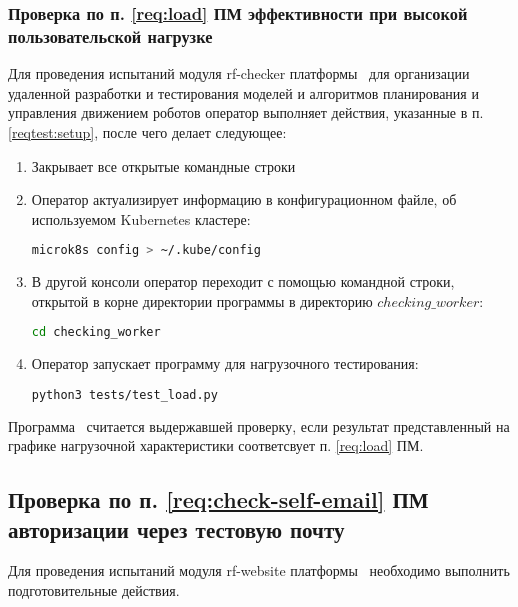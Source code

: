 \subsubsection{Проверка по п. \ref{req:load} ПМ эффективности при высокой пользовательской нагрузке} \label{reqtest:load}
Для проведения испытаний модуля rf-checker платформы \productname\ для организации удаленной разработки и тестирования моделей и алгоритмов планирования и управления движением роботов оператор выполняет действия, указанные в п. \ref{reqtest:setup}, после чего делает следующее:
\begin{enumerate}
    \item Закрывает все открытые командные строки
    \item Оператор актуализирует информацию в конфигурационном файле, об используемом Kubernetes кластере:
    \begin{lstlisting}[language=bash, numbers=none, frame=single]
        microk8s config > ~/.kube/config
    \end{lstlisting}
    \item В другой консоли оператор переходит с помощью командной строки, открытой в корне директории программы в директорию $checking\_worker$:
    \begin{lstlisting}[language=bash, numbers=none, frame=single]
    cd checking_worker
    \end{lstlisting}
    \item Оператор запускает программу для нагрузочного тестирования:
    \begin{lstlisting}[language=bash, numbers=none, frame=single]
    python3 tests/test_load.py
    \end{lstlisting}
\end{enumerate}
Программа \programname\ считается выдержавшей проверку, если результат представленный на графике нагрузочной характеристики соответсвует п. \ref{req:load} ПМ.

\subsection{Проверка по п. \ref{req:check-self-email} ПМ авторизации через тестовую почту} \label{reqtest:pm-1}
Для проведения испытаний модуля rf-website платформы \productname\ необходимо выполнить подготовительные действия.

